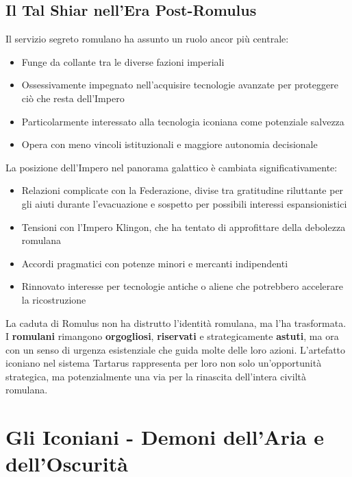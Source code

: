 \documentclass[letterpaper,twocolumn,openany,nodeprecatedcode]{dndbook}
\begin{document}
\subsection{Il Tal Shiar nell'Era Post-Romulus}
Il servizio segreto romulano ha assunto un ruolo ancor più centrale:

\begin{itemize}
    \item Funge da collante tra le diverse fazioni imperiali
    \item Ossessivamente impegnato nell'acquisire tecnologie avanzate per proteggere ciò che resta dell'Impero
    \item Particolarmente interessato alla tecnologia iconiana come potenziale salvezza
    \item Opera con meno vincoli istituzionali e maggiore autonomia decisionale
\end{itemize}

La posizione dell'Impero nel panorama galattico è cambiata significativamente:

\begin{itemize}
    \item Relazioni complicate con la Federazione, divise tra gratitudine riluttante per gli aiuti durante l'evacuazione e sospetto per possibili interessi espansionistici
    \item Tensioni con l'Impero Klingon, che ha tentato di approfittare della debolezza romulana
    \item Accordi pragmatici con potenze minori e mercanti indipendenti
    \item Rinnovato interesse per tecnologie antiche o aliene che potrebbero accelerare la ricostruzione
\end{itemize}

La caduta di Romulus non ha distrutto l'identità romulana, ma l'ha trasformata. I \textbf{romulani} rimangono \textbf{orgogliosi}, \textbf{riservati} e strategicamente \textbf{astuti}, ma ora con un senso di urgenza esistenziale che guida molte delle loro azioni. L'artefatto iconiano nel sistema Tartarus rappresenta per loro non solo un'opportunità strategica, ma potenzialmente una via per la rinascita dell'intera civiltà romulana.


\section{Gli Iconiani - Demoni dell'Aria e dell'Oscurità}
\end{document}
